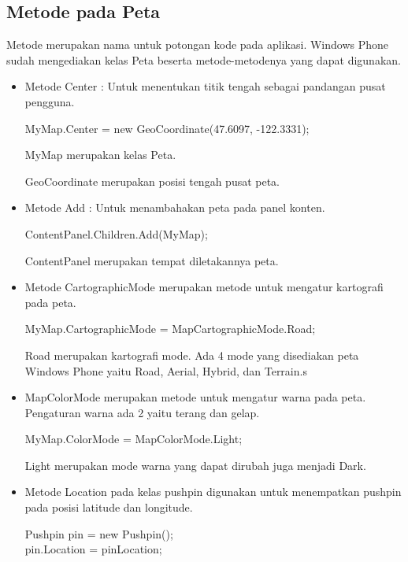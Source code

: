 \subsection{Metode pada Peta}
\label{subsec:Metode pada Peta}
\hspace{0.5cm} Metode merupakan nama untuk potongan kode pada aplikasi. Windows Phone sudah mengediakan kelas Peta beserta metode-metodenya yang dapat digunakan.
\begin{itemize}
	\item Metode Center : Untuk menentukan titik tengah sebagai pandangan pusat pengguna. 
		\begin{center}
			MyMap.Center = new GeoCoordinate(47.6097, -122.3331);
		\end{center}
		
		MyMap merupakan kelas Peta.
		
		GeoCoordinate merupakan posisi tengah pusat peta.
	\item Metode Add : Untuk menambahakan peta pada panel konten.
		\begin{center}
			ContentPanel.Children.Add(MyMap);
		\end{center}
		
		ContentPanel merupakan tempat diletakannya peta.
		
	\item Metode CartographicMode merupakan metode untuk mengatur kartografi pada peta.
		\begin{center}
			MyMap.CartographicMode = MapCartographicMode.Road;
		\end{center}
		
		Road merupakan kartografi mode. Ada 4 mode yang disediakan peta Windows Phone yaitu Road, Aerial, Hybrid, dan Terrain.s
		
	\item MapColorMode merupakan metode untuk mengatur warna pada peta. Pengaturan warna ada 2 yaitu terang dan gelap.
		\begin{center}
			MyMap.ColorMode = MapColorMode.Light;
		\end{center}
		
		Light merupakan mode warna yang dapat dirubah juga menjadi Dark.
		
	\item Metode Location pada kelas pushpin digunakan untuk menempatkan pushpin pada posisi latitude dan longitude. 	
	\begin{center}
						Pushpin pin = new Pushpin();\\
            pin.Location = pinLocation;
	\end{center}					
\end{itemize}

